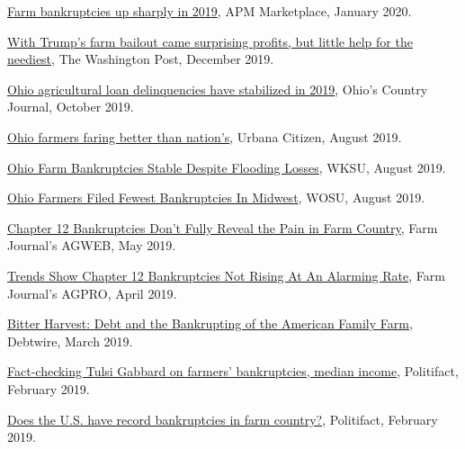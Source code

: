 \documentclass[letterpaper]{article}
\renewenvironment{itemize}{
  \begin{list}{}{
    \setlength{\leftmargin}{1.5em}
  }
}{
  \end{list}
}
\begin{document}
\begin{itemize}
\item \href{https://www.marketplace.org/2020/01/31/farm-bankruptcies-up-sharply-in-2019/}{Farm bankruptcies up sharply in 2019}, APM Marketplace, January 2020.
\item \href{https://www.washingtonpost.com/business/2019/12/21/after-miserable-farm-sector-still-came-out-ahead-thanks-government-assistance/?arc404=true}{With Trump's farm bailout came surprising profits, but little help for the neediest}, The Washington Post, December 2019.

\item \href{https://www.ocj.com/2019/10/ohio-agricultural-loan-delinquencies-have-stabilized-in-2019/}{Ohio agricultural loan delinquencies have stabilized in 2019}, Ohio's Country Journal, October 2019.
\item \href{https://www.urbanacitizen.com/news/71744/ohio-farmers-faring-better-than-nations}{Ohio farmers faring better than nation's}, Urbana Citizen, August 2019.

\item \href{https://www.wksu.org/post/ohio-farm-bankruptcies-stable-despite-flooding-losses#stream/0}{Ohio Farm Bankruptcies Stable Despite Flooding Losses}, WKSU, August 2019.
\item \href{https://radio.wosu.org/post/ohio-farmers-filed-fewest-bankruptcies-midwest#stream/0}{Ohio Farmers Filed Fewest Bankruptcies In Midwest}, WOSU, August 2019.
\item \href{https://www.agweb.com/article/chapter-12-bankruptcies-dont-fully-reveal-the-pain-in-farm-country/}{Chapter 12 Bankruptcies Don't Fully Reveal the Pain in Farm Country}, Farm Journal's AGWEB, May 2019.
\item \href{https://www.agprofessional.com/article/trends-show-chapter-12-bankruptcies-not-rising-alarming-rate}{Trends Show Chapter 12 Bankruptcies Not Rising At An Alarming Rate}, Farm Journal's AGPRO, April 2019.
\item \href{http://investigations.debtwire.com/bitter-harvest-debt-and-the-bankrupting-of-the-american-family-farm/}{Bitter Harvest: Debt and the Bankrupting of the American Family Farm}, Debtwire, March 2019.
\item \href{https://www.politifact.com/truth-o-meter/statements/2019/feb/27/tulsi-gabbard/tulsi-gabbard/}{Fact-checking Tulsi Gabbard on farmers' bankruptcies, median income}, Politifact, February 2019.
\item \href{https://www.politifact.com/punditfact/statements/2019/feb/26/heidi-heitkamp/does-us-have-record-bankruptcies-farm-country/}{Does the U.S. have record bankruptcies in farm country?}, Politifact, February 2019.


\end{itemize}
\end{document}

